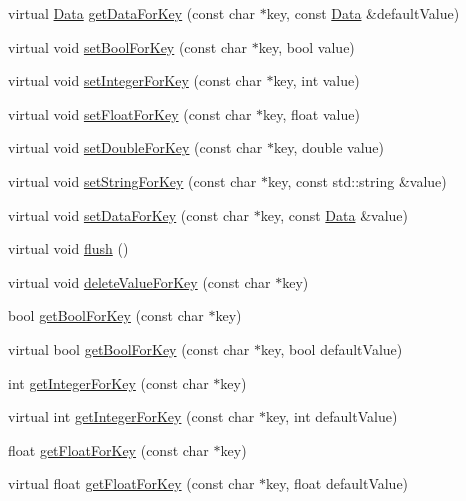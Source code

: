 \begin{DoxyCompactItemize}
\item 
virtual \hyperlink{classData}{Data} \hyperlink{classUserDefault_a1b0e4faf809d850546fab10a2fea9770}{get\+Data\+For\+Key} (const char $\ast$key, const \hyperlink{classData}{Data} \&default\+Value)
\item 
virtual void \hyperlink{classUserDefault_aca71ebb723b249c4c3ab85a5b145a483}{set\+Bool\+For\+Key} (const char $\ast$key, bool value)
\item 
virtual void \hyperlink{classUserDefault_a4fbe77ef7b5ed9e7f69f8267034d6ebd}{set\+Integer\+For\+Key} (const char $\ast$key, int value)
\item 
virtual void \hyperlink{classUserDefault_a3b767898ff245bbf2a94afc1caf70fc7}{set\+Float\+For\+Key} (const char $\ast$key, float value)
\item 
virtual void \hyperlink{classUserDefault_ab8d1bec4ff633818b91f69a3a23abd8d}{set\+Double\+For\+Key} (const char $\ast$key, double value)
\item 
virtual void \hyperlink{classUserDefault_ab2024c825a63e8c78f49b0b2f5b66f37}{set\+String\+For\+Key} (const char $\ast$key, const std\+::string \&value)
\item 
virtual void \hyperlink{classUserDefault_ae051a204ff32348f56a535d4edf2d77e}{set\+Data\+For\+Key} (const char $\ast$key, const \hyperlink{classData}{Data} \&value)
\item 
virtual void \hyperlink{classUserDefault_a6633f895457c6a225c46a559afb86f80}{flush} ()
\item 
virtual void \hyperlink{classUserDefault_a461d5709bb8bfcfa478a94944e8f5144}{delete\+Value\+For\+Key} (const char $\ast$key)
\item 
bool \hyperlink{classUserDefault_a81d252db31d6e11ae2e1ded0e0bdce5c}{get\+Bool\+For\+Key} (const char $\ast$key)
\item 
virtual bool \hyperlink{classUserDefault_a62f8a93f34043a909e73720ea0d292a5}{get\+Bool\+For\+Key} (const char $\ast$key, bool default\+Value)
\item 
int \hyperlink{classUserDefault_a76088fadfecbeaf693c002d5bdb8c622}{get\+Integer\+For\+Key} (const char $\ast$key)
\item 
virtual int \hyperlink{classUserDefault_a60d49eca521265b315ce007124633a40}{get\+Integer\+For\+Key} (const char $\ast$key, int default\+Value)
\item 
float \hyperlink{classUserDefault_a04582157f27ec75bbc9a8abaf9c709a9}{get\+Float\+For\+Key} (const char $\ast$key)
\item 
virtual float \hyperlink{classUserDefault_aa6f1c1d8cf6e4286abe397b0f03087bd}{get\+Float\+For\+Key} (const char $\ast$key, float default\+Value)

\end{DoxyCompactItemize}
